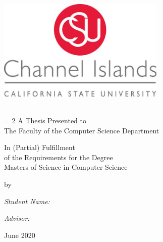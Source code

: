 \begin{titlepage}
\begin{center}
\includegraphics[width=0.60\textwidth]{media/correctlogo.jpg}~\\


\HRule \\[0.5cm]
{\Large \bfseries \thesistitle \par}

\vspace{0.5 cm}

\baselineskip = 2\baselineskip
A Thesis Presented to \\
The Faculty of the Computer Science Department

\vspace{0.5 cm}

In (Partial) Fulfillment\\
of the Requirements for the Degree\\
Masters of Science in Computer Science\\

\vspace{0.5 cm }


by \\

\begin{minipage}{0.4\textwidth}
\begin{flushleft} \small
\emph{Student Name:}\\
\textsc{\studentname}
\end{flushleft}
\end{minipage}
\begin{minipage}{0.4\textwidth}
\begin{flushright} \small
\emph{Advisor:} \\
\textsc{\advisorname}
\end{flushright}
\end{minipage}

June 2020\\
\HRule \\[1.0cm]
\end{center}
\end{titlepage}